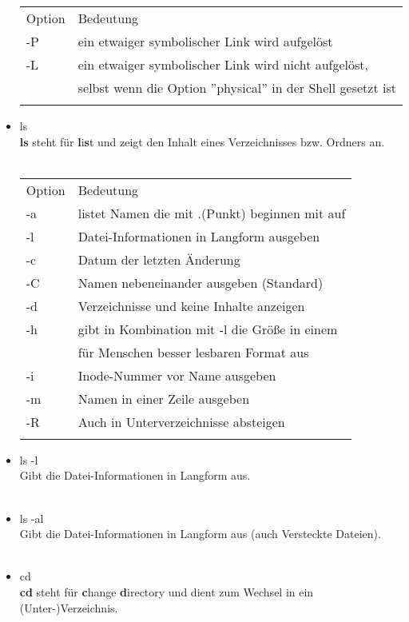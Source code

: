 \begin{itemize}
\begin{tabular}{ll}
				Option & Bedeutung \\
				-P & ein etwaiger symbolischer Link wird aufgel\"ost\\
				-L & ein etwaiger symbolischer Link wird nicht aufgel\"ost,\\
				 & selbst wenn die Option ''physical'' in der Shell gesetzt ist\\ \\
			\end{tabular}
			\item ls \\
			\textbf{ls} steht f\"ur \textbf{l}i\textbf{s}t und zeigt den Inhalt eines Verzeichnisses bzw. Ordners an.\\ \\
			\begin{tabular}{ll}
				Option & Bedeutung \\
				-a & listet Namen die mit .(Punkt) beginnen mit auf\\
				-l & Datei-Informationen in Langform ausgeben\\
				-c & Datum der letzten \"Anderung\\
				-C & Namen nebeneinander ausgeben (Standard)\\
				-d & Verzeichnisse und keine Inhalte anzeigen\\
				-h & gibt in Kombination mit -l die Gr\"oße in einem\\
				 & für Menschen besser lesbaren Format aus\\
				-i & Inode-Nummer vor Name ausgeben\\
				-m & Namen in einer Zeile ausgeben\\
				-R & Auch in Unterverzeichnisse absteigen\\ \\
			\end{tabular}
			\item ls -l\\
			Gibt die Datei-Informationen in Langform aus.\\ \\
			\item ls -al\\
			Gibt die Datei-Informationen in Langform aus (auch Versteckte Dateien).\\ \\
			\item cd\\
			\textbf{cd} steht f\"ur \textbf{c}hange \textbf{d}irectory und dient zum Wechsel in ein (Unter-)Verzeichnis.\\ \\

\end{itemize}
